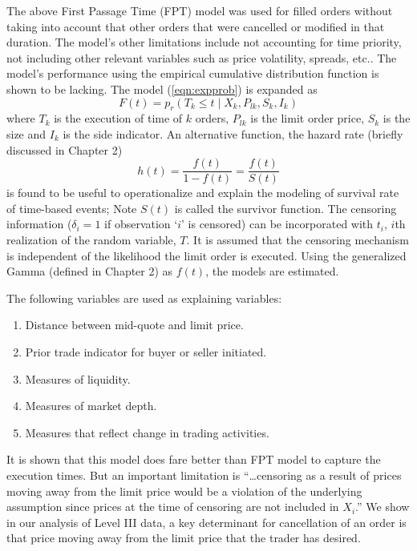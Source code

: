 The above First Passage Time (FPT) model was used for filled orders without taking into account that other orders that were cancelled or modified in that duration. The model's other limitations include not accounting for time priority, not including other relevant variables such as price volatility, spreads, etc.. The model's performance using the empirical cumulative distribution function is shown to be lacking. The model (\ref{eqn:expprob}) is expanded as
	\begin{equation}\label{eqn:cumexpmodel}
	F(t)=p_r(T_k \leq t \;|\; X_k,P_{lk}, S_k, I_k)
	\end{equation}
where $T_k$ is the execution of time of $k$ orders, $P_{lk}$ is the limit order price, $S_k$ is the size and $I_k$ is the side indicator. An alternative function, the hazard rate (briefly discussed in Chapter 2)
	\begin{equation}\label{eqn:hazard}
	h(t)=\dfrac{f(t)}{1-f(t)}= \dfrac{f(t)}{S(t)}
	\end{equation}
is found to be useful to operationalize and explain the modeling of survival rate of time-based events; Note $S(t)$ is called the survivor function. The censoring information ($\delta_i=1$ if observation `$i$' is censored) can be incorporated with $t_i$, $i$th realization of the random variable, $T$. It is assumed that the censoring mechanism is independent of the likelihood the limit order is executed. Using the generalized Gamma (defined in Chapter 2) as $f(t)$, the models are estimated.


The following variables are used as explaining variables:
\begin{enumerate}[--]
\item Distance between mid-quote and limit price.
\item Prior trade indicator for buyer or seller initiated.
\item Measures of liquidity.
\item Measures of market depth.
\item Measures that reflect change in trading activities. 
\end{enumerate}
It is shown that this model does fare better than FPT model to capture the execution times. But an important limitation is ``\dots censoring as a result of prices moving away from the limit price would be a violation of the underlying assumption since prices at the time of censoring are not included in $X_i$.'' We show in our analysis of Level III data, a key determinant for cancellation of an order is that price moving away from the limit price that the trader has desired. 


